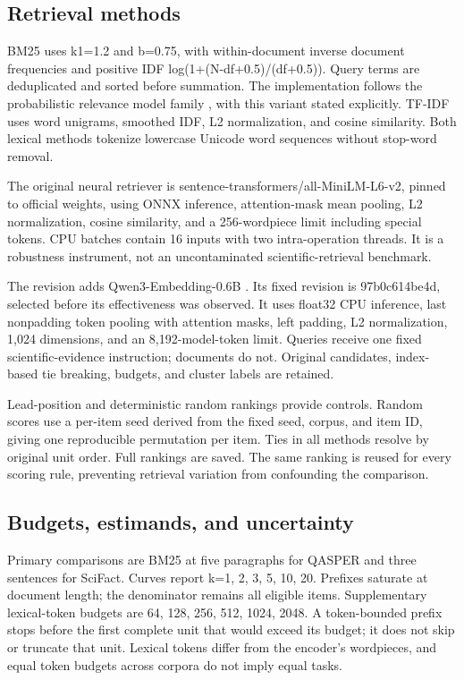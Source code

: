 \documentclass[twoside,a4paper,11pt]{article}
\begin{document}
\subsection{Retrieval methods}
BM25 uses k1=1.2 and b=0.75, with within-document inverse document frequencies and positive IDF log(1+(N-df+0.5)/(df+0.5)). Query terms are deduplicated and sorted before summation. The implementation follows the probabilistic relevance model family \citep{bm25}, with this variant stated explicitly. TF-IDF uses word unigrams, smoothed IDF, L2 normalization, and cosine similarity. Both lexical methods tokenize lowercase Unicode word sequences without stop-word removal.

The original neural retriever is sentence-transformers/all-MiniLM-L6-v2, pinned to official weights, using ONNX inference, attention-mask mean pooling, L2 normalization, cosine similarity, and a 256-wordpiece limit including special tokens. CPU batches contain 16 inputs with two intra-operation threads. It is a robustness instrument, not an uncontaminated scientific-retrieval benchmark.

The revision adds Qwen3-Embedding-0.6B \citep{qwen}. Its fixed revision is 97b0c614be4d, selected before its effectiveness was observed. It uses float32 CPU inference, last nonpadding token pooling with attention masks, left padding, L2 normalization, 1,024 dimensions, and an 8,192-model-token limit. Queries receive one fixed scientific-evidence instruction; documents do not. Original candidates, index-based tie breaking, budgets, and cluster labels are retained.

Lead-position and deterministic random rankings provide controls. Random scores use a per-item seed derived from the fixed seed, corpus, and item ID, giving one reproducible permutation per item. Ties in all methods resolve by original unit order. Full rankings are saved. The same ranking is reused for every scoring rule, preventing retrieval variation from confounding the comparison.


\subsection{Budgets, estimands, and uncertainty}
Primary comparisons are BM25 at five paragraphs for QASPER and three sentences for SciFact. Curves report k=1, 2, 3, 5, 10, 20. Prefixes saturate at document length; the denominator remains all eligible items. Supplementary lexical-token budgets are 64, 128, 256, 512, 1024, 2048. A token-bounded prefix stops before the first complete unit that would exceed its budget; it does not skip or truncate that unit. Lexical tokens differ from the encoder's wordpieces, and equal token budgets across corpora do not imply equal tasks.
\end{document}
